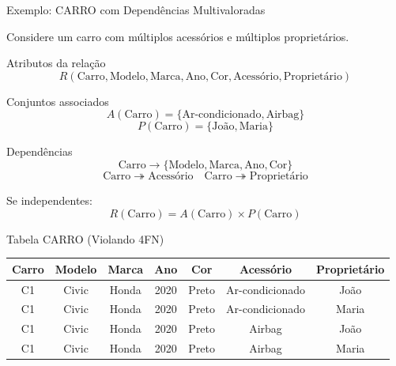 \documentclass[9pt]{beamer}
\begin{document}
\begin{frame}{Exemplo: CARRO com Dependências Multivaloradas}
\small

Considere um carro com múltiplos acessórios e múltiplos proprietários.

\vspace{0.2cm}

\begin{block}{Atributos da relação}
\[
R(\text{Carro}, \text{Modelo}, \text{Marca}, \text{Ano}, \text{Cor}, \text{Acessório}, \text{Proprietário})
\]
\end{block}

\vspace{0.2cm}

\begin{block}{Conjuntos associados}
\[
A(\text{Carro}) = \{\text{Ar-condicionado}, \text{Airbag}\}
\]
\[
P(\text{Carro}) = \{\text{João}, \text{Maria}\}
\]
\end{block}

\vspace{0.3cm}

\begin{alertblock}{Dependências}
\[
\text{Carro} \rightarrow \{\text{Modelo}, \text{Marca}, \text{Ano}, \text{Cor}\}
\]
\[
\text{Carro} \twoheadrightarrow \text{Acessório}
\quad
\text{Carro} \twoheadrightarrow \text{Proprietário}
\]
\end{alertblock}

\vspace{0.3cm}

\centering
Se independentes:
\[
R(\text{Carro}) = A(\text{Carro}) \times P(\text{Carro})
\]

\end{frame}\begin{frame}{Tabela CARRO (Violando 4FN)}
\scriptsize

\centering
\begin{tabular}{|c|c|c|c|c|c|c|}
\hline
Carro & Modelo & Marca & Ano & Cor & Acessório & Proprietário \\ \hline
C1 & Civic & Honda & 2020 & Preto & Ar-condicionado & João \\ \hline
C1 & Civic & Honda & 2020 & Preto & Ar-condicionado & Maria \\ \hline
C1 & Civic & Honda & 2020 & Preto & Airbag & João \\ \hline
C1 & Civic & Honda & 2020 & Preto & Airbag & Maria \\ \hline
\end{tabular}


\end{frame}
\end{document}
